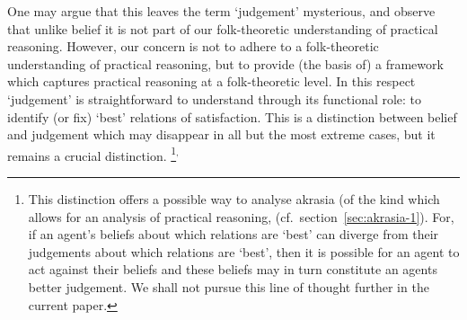 \documentclass[10pt]{article}
\begin{document}
One may argue that this leaves the term `judgement' mysterious, and observe that unlike belief it is not part of our folk-theoretic understanding of practical reasoning.
However, our concern is not to adhere to a folk-theoretic understanding of practical reasoning, but to provide (the basis of) a framework which captures practical reasoning at a folk-theoretic level.
In this respect `judgement' is straightforward to understand through its functional role: to identify (or fix) `best' relations of satisfaction.
This is a distinction between belief and judgement which may disappear in all but the most extreme cases, but it remains a crucial distinction.\nolinebreak
\footnote{This distinction offers a possible way to analyse akrasia (of the kind which  allows for an analysis of practical reasoning, (cf.\ section~\ref{sec:akrasia-1}).
  For, if an agent's beliefs about which relations are `best' can diverge from their judgements about which relations are `best', then it is possible for an agent to act against their beliefs and these beliefs may in turn constitute an agents better judgement.
  We shall not pursue this line of thought further in the current paper.}\(^{,}\)\nolinebreak
\end{document}
